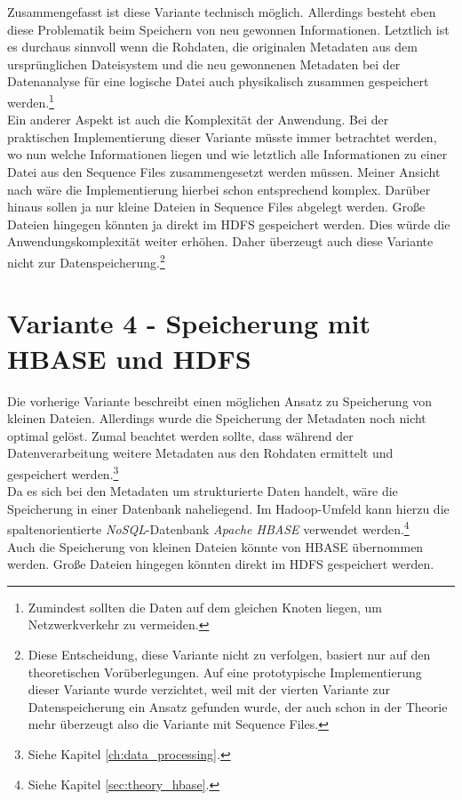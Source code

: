 \noindent
Zusammengefasst ist diese Variante technisch möglich. Allerdings besteht eben diese Problematik beim Speichern von neu gewonnen Informationen. Letztlich ist es durchaus sinnvoll wenn die Rohdaten, die originalen Metadaten aus dem ursprünglichen Dateisystem und die neu gewonnenen Metadaten bei der Datenanalyse für eine logische Datei auch physikalisch zusammen gespeichert werden.\footnote{Zumindest sollten die Daten auf dem gleichen Knoten liegen, um Netzwerkverkehr zu vermeiden.}\\ 
Ein anderer Aspekt ist auch die Komplexität der Anwendung. Bei der praktischen Implementierung dieser Variante müsste immer betrachtet werden, wo nun welche Informationen liegen und wie letztlich alle Informationen zu einer Datei aus den Sequence Files zusammengesetzt werden müssen. Meiner Ansicht nach wäre die Implementierung hierbei schon entsprechend komplex. Darüber hinaus sollen ja nur kleine Dateien in Sequence Files abgelegt werden. Große Dateien hingegen könnten ja direkt im HDFS gespeichert werden. Dies würde die Anwendungskomplexität weiter erhöhen. Daher überzeugt auch diese Variante nicht zur Datenspeicherung.\footnote{Diese Entscheidung, diese Variante nicht zu verfolgen, basiert nur auf den theoretischen Vorüberlegungen. Auf eine prototypische Implementierung dieser Variante wurde verzichtet, weil mit der vierten Variante zur Datenspeicherung ein Ansatz gefunden wurde, der auch schon in der Theorie mehr überzeugt also die Variante mit Sequence Files.}

\section{Variante 4 - Speicherung mit HBASE und HDFS}
Die vorherige Variante beschreibt einen möglichen Ansatz zu Speicherung von kleinen Dateien. Allerdings wurde die Speicherung der Metadaten noch nicht optimal gelöst. Zumal beachtet werden sollte, dass während der Datenverarbeitung weitere Metadaten aus den Rohdaten ermittelt und gespeichert werden.\footnote{Siehe Kapitel \ref{ch:data_processing}.}\\
Da es sich bei den Metadaten um strukturierte Daten handelt, wäre die Speicherung in einer Datenbank naheliegend. Im Hadoop-Umfeld kann hierzu die spaltenorientierte \textit{NoSQL}-Datenbank \textit{Apache HBASE} verwendet werden.\footnote{Siehe Kapitel \ref{sec:theory_hbase}.}\\
Auch die Speicherung von kleinen Dateien könnte von HBASE übernommen werden. Große Dateien hingegen könnten direkt im HDFS gespeichert werden. 


